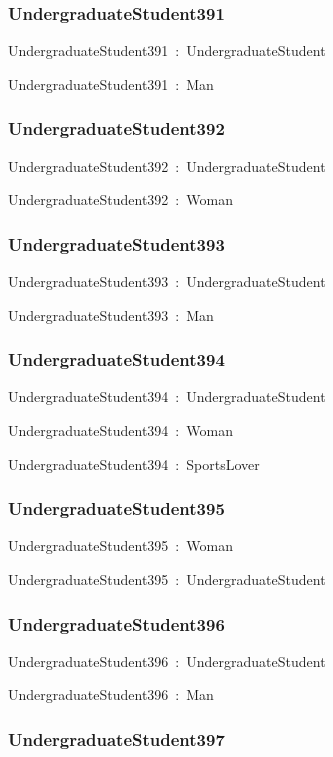 \documentclass{article}
\begin{document}
\subsubsection*{UndergraduateStudent391}

UndergraduateStudent391~:~UndergraduateStudent

UndergraduateStudent391~:~Man

\subsubsection*{UndergraduateStudent392}

UndergraduateStudent392~:~UndergraduateStudent

UndergraduateStudent392~:~Woman

\subsubsection*{UndergraduateStudent393}

UndergraduateStudent393~:~UndergraduateStudent

UndergraduateStudent393~:~Man

\subsubsection*{UndergraduateStudent394}

UndergraduateStudent394~:~UndergraduateStudent

UndergraduateStudent394~:~Woman

UndergraduateStudent394~:~SportsLover

\subsubsection*{UndergraduateStudent395}

UndergraduateStudent395~:~Woman

UndergraduateStudent395~:~UndergraduateStudent

\subsubsection*{UndergraduateStudent396}

UndergraduateStudent396~:~UndergraduateStudent

UndergraduateStudent396~:~Man

\subsubsection*{UndergraduateStudent397}
\end{document}
